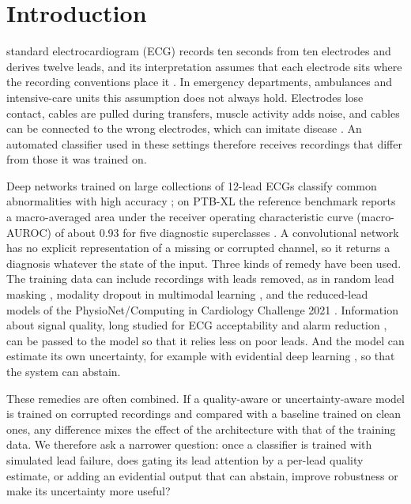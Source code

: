 \section{Introduction}
\label{sec:introduction}


 standard electrocardiogram (ECG) records ten seconds from ten electrodes and derives twelve
leads, and its interpretation assumes that each electrode sits where the recording conventions place it
\cite{kligfield2007recommendations}. In emergency departments, ambulances and intensive-care units this assumption
does not always hold. Electrodes lose contact, cables are pulled during transfers, muscle activity adds noise, and
cables can be connected to the wrong electrodes, which can imitate disease \cite{batchvarov2007incorrect}. An
automated classifier used in these settings therefore receives recordings that differ from those it was trained
on.

Deep networks trained on large collections of 12-lead ECGs classify common abnormalities with high accuracy
\cite{ribeiro2020automatic}; on PTB-XL the reference benchmark reports a macro-averaged area under the receiver
operating characteristic curve (macro-AUROC) of about 0.93 for five diagnostic superclasses
\cite{strodthoff2021benchmark}. A convolutional network has no explicit representation of a missing or corrupted
channel, so it returns a diagnosis whatever the state of the input. Three kinds of remedy have been used. The
training data can include recordings with leads removed, as in random lead masking \cite{oh2022leadagnostic},
modality dropout in multimodal learning \cite{neverova2016moddrop}, and the reduced-lead models of the
PhysioNet/Computing in Cardiology Challenge 2021 \cite{reyna2021willtwodo,nejedly2022ensemble}. Information about
signal quality, long studied for ECG acceptability and alarm reduction \cite{clifford2012sqi,behar2013sqi}, can be
passed to the model so that it relies less on poor leads. And the model can estimate its own uncertainty, for
example with evidential deep learning \cite{sensoy2018edl}, so that the system can abstain.

These remedies are often combined. If a quality-aware or uncertainty-aware model is trained on corrupted recordings
and compared with a baseline trained on clean ones, any difference mixes the effect of the architecture with that
of the training data. We therefore ask a narrower question: once a classifier is trained with simulated lead
failure, does gating its lead attention by a per-lead quality estimate, or adding an evidential output that can
abstain, improve robustness or make its uncertainty more useful?


